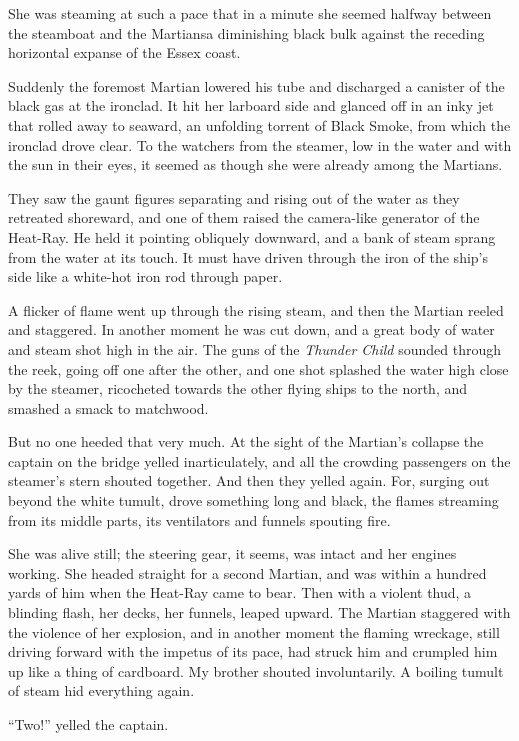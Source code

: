 She was steaming at such a pace that in a minute she seemed halfway
between the steamboat and the Martians\dash{}a diminishing black bulk
against the receding horizontal expanse of the Essex coast.

Suddenly the foremost Martian lowered his tube and discharged a
canister of the black gas at the ironclad. It hit her larboard side
and glanced off in an inky jet that rolled away to seaward, an
unfolding torrent of Black Smoke, from which the ironclad drove
clear. To the watchers from the steamer, low in the water and with
the sun in their eyes, it seemed as though she were already among
the Martians.

They saw the gaunt figures separating and rising out of the water
as they retreated shoreward, and one of them raised the camera-like
generator of the Heat-Ray. He held it pointing obliquely downward,
and a bank of steam sprang from the water at its touch. It must
have driven through the iron of the ship's side like a white-hot
iron rod through paper.

A flicker of flame went up through the rising steam, and then the
Martian reeled and staggered. In another moment he was cut down,
and a great body of water and steam shot high in the air. The guns
of the \emph{Thunder Child} sounded through the reek, going off one
after the other, and one shot splashed the water high close by the
steamer, ricocheted towards the other flying ships to the north,
and smashed a smack to matchwood.

But no one heeded that very much. At the sight of the Martian's
collapse the captain on the bridge yelled inarticulately, and all
the crowding passengers on the steamer's stern shouted together.
And then they yelled again. For, surging out beyond the white
tumult, drove something long and black, the flames streaming from
its middle parts, its ventilators and funnels spouting fire.

She was alive still; the steering gear, it seems, was intact and
her engines working. She headed straight for a second Martian, and
was within a hundred yards of him when the Heat-Ray came to bear.
Then with a violent thud, a blinding flash, her decks, her funnels,
leaped upward. The Martian staggered with the violence of her
explosion, and in another moment the flaming wreckage, still
driving forward with the impetus of its pace, had struck him and
crumpled him up like a thing of cardboard. My brother shouted
involuntarily. A boiling tumult of steam hid everything again.

``Two!'' yelled the captain.

